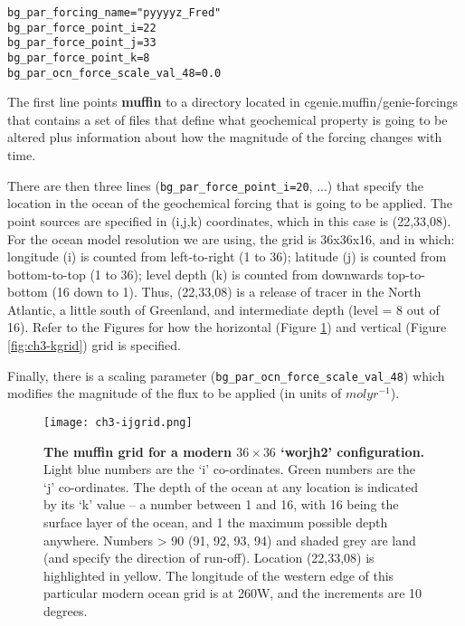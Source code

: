 \documentclass[11pt,fleqn]{book} %
\begin{document}
\vspace{-2mm}
\begin{verbatim}
bg_par_forcing_name="pyyyyz_Fred"
bg_par_force_point_i=22
bg_par_force_point_j=33
bg_par_force_point_k=8
bg_par_ocn_force_scale_val_48=0.0
\end{verbatim}
\vspace{-2mm}

The first line points \textbf{muffin} to a directory located in \textsf{\footnotesize cgenie.muffin/genie-forcings} that contains a set of files that define what geochemical property is going to be altered plus information about how the magnitude of the forcing changes with time.

There are then three lines (\texttt{bg\_par\_force\_point\_i=20}, ...) that specify the location in the ocean of the geochemical forcing that is going to be applied. The point sources are specified in (i,j,k) coordinates, which in this case is (22,33,08). For the ocean model resolution we are using, the grid is 36x36x16, and in which: longitude (i) is counted from left-to-right (1 to 36); latitude (j) is counted from bottom-to-top (1 to 36); level depth (k) is counted from downwards top-to-bottom (16 down to 1). Thus, (22,33,08) is a release of tracer in the North Atlantic, a little south of Greenland, and intermediate depth (level = 8 out of 16). Refer to the Figures for how the horizontal (Figure \ref{fig:ch3-ijgrid}) and vertical (Figure \ref{fig:ch3-kgrid}) grid is specified.

Finally, there is a scaling parameter (\texttt{bg\_par\_ocn\_force\_scale\_val\_48}) which modifies the magnitude of the flux to be applied (in units of \(mol yr^{-1}\)).

\begin{figure}
\texttt{[image: ch3-ijgrid.png]}\centering
\vspace{-0mm}
\caption{
\textbf{The  muffin grid for a modern \(36\times36\) ‘worjh2’ configuration.} Light blue numbers are the ‘i’ co-ordinates. Green numbers are the ‘j’ co-ordinates.
The depth of the ocean at any location is indicated by its ‘k’ value – a number between 1 and 16, with 16 being the surface layer of the ocean, and 1 the maximum possible depth anywhere.
Numbers > 90 (91, 92, 93, 94) and shaded grey are land (and specify the direction of run-off).
Location (22,33,08) is highlighted in yellow.
The longitude of the western edge of this particular modern ocean grid is at 260W, and the increments are 10 degrees.
}
\label{fig:ch3-ijgrid}
\end{figure}
\end{document}

